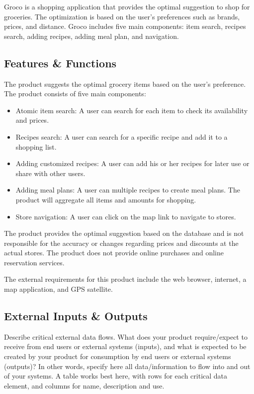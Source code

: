 Groco is a shopping application that provides the optimal suggestion to shop for groceries. The optimization is based on the user's preferences such as brands, prices, and distance. Groco includes five main components: item search, recipes search, adding recipes, adding meal plan, and navigation.

\subsection{Features \& Functions}
The product suggests the optimal grocery items based on the user's preference. The product consists of five main components:
\begin{itemize}
    \item Atomic item search: A user can search for each item to check its availability and prices.
    \item Recipes search: A user can search for a specific recipe and add it to a shopping list.
    \item Adding customized recipes: A user can add his or her recipes for later use or share with other users.
    \item Adding meal plans: A user can multiple recipes to create meal plans. The product will aggregate all items and amounts for shopping.
    \item Store navigation: A user can click on the map link to navigate to stores.
\end{itemize}
The product provides the optimal suggestion based on the database and is not responsible for the accuracy or changes regarding prices and discounts at the actual stores. The product does not provide online purchases and online reservation services.

The external requirements for this product include the web browser, internet, a map application, and GPS satellite.

\subsection{External Inputs \& Outputs}
Describe critical external data flows. What does your product require/expect to receive from end users or external systems (inputs), and what is expected to be created by your product for consumption by end users or external systems (outputs)? In other words, specify here all data/information to flow into and out of your systems. A table works best here, with rows for each critical data element, and columns for name, description and use.

